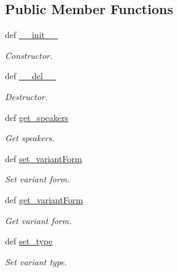 \subsection*{Public Member Functions}
\begin{DoxyCompactItemize}
\item 
def \hyperlink{classlmf_1_1src_1_1core_1_1form__representation_1_1_form_representation_ab034318ab1492fac033d745860e18a37}{\+\_\+\+\_\+init\+\_\+\+\_\+}
\begin{DoxyCompactList}\small\item\em Constructor. \end{DoxyCompactList}\item 
def \hyperlink{classlmf_1_1src_1_1core_1_1form__representation_1_1_form_representation_a577b5258bf8f64ff889f0588cf0c8eda}{\+\_\+\+\_\+del\+\_\+\+\_\+}
\begin{DoxyCompactList}\small\item\em Destructor. \end{DoxyCompactList}\item 
def \hyperlink{classlmf_1_1src_1_1core_1_1form__representation_1_1_form_representation_a348d8eb39ef5bda7789106c9f5fe7755}{get\+\_\+speakers}
\begin{DoxyCompactList}\small\item\em Get speakers. \end{DoxyCompactList}\item 
def \hyperlink{classlmf_1_1src_1_1core_1_1form__representation_1_1_form_representation_af556c7aa6c243038ba8239ef03e2689b}{set\+\_\+variant\+Form}
\begin{DoxyCompactList}\small\item\em Set variant form. \end{DoxyCompactList}\item 
def \hyperlink{classlmf_1_1src_1_1core_1_1form__representation_1_1_form_representation_ac977eb7028af4f5715a4cb1f4908c627}{get\+\_\+variant\+Form}
\begin{DoxyCompactList}\small\item\em Get variant form. \end{DoxyCompactList}\item 
def \hyperlink{classlmf_1_1src_1_1core_1_1form__representation_1_1_form_representation_acb1bd217666635fea4e9af729865d84c}{set\+\_\+type}
\begin{DoxyCompactList}\small\item\em Set variant type. \end{DoxyCompactList}\item 

\end{DoxyCompactItemize}
